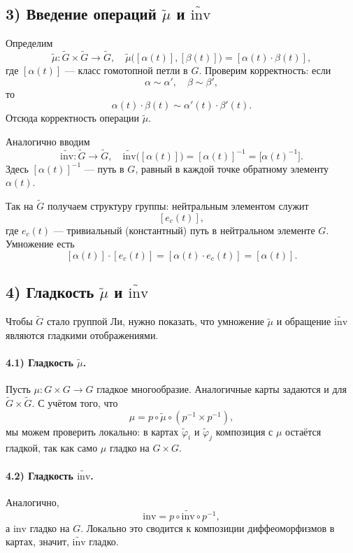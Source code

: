 \documentclass{article}
\begin{document}
\subsection*{3) Введение операций $\widetilde{\mu}$ и $\widetilde{\mathrm{inv}}$}
Определим
\[
\widetilde{\mu} \colon \widetilde{G} \times \widetilde{G} \to \widetilde{G},
\quad
\widetilde{\mu}\bigl([\alpha(t)], [\beta(t)]\bigr) = [\alpha(t) \cdot \beta(t)],
\]
где $[\alpha(t)]$ --- класс гомотопной петли в $G$. Проверим корректность: если
\[
\alpha \sim \alpha', \quad \beta \sim \beta',
\]
то
\[
\alpha(t)\cdot \beta(t) \sim \alpha'(t)\cdot \beta'(t).
\]
Отсюда корректность операции $\widetilde{\mu}$.

Аналогично вводим
\[
\widetilde{\mathrm{inv}} \colon \widetilde{G} \to \widetilde{G}, \quad
\widetilde{\mathrm{inv}}\bigl([\alpha(t)]\bigr) = [\alpha(t)]^{-1} = \bigl[\alpha(t)^{-1}\bigr].
\]
Здесь $[\alpha(t)]^{-1}$ --- путь в $G$, равный в каждой точке обратному элементу $\alpha(t)$.

Так на $\widetilde{G}$ получаем структуру группы: нейтральным элементом служит
\[
[e_c(t)],
\]
где $e_c(t)$ --- тривиальный (константный) путь в нейтральном элементе $G$. Умножение есть
\[
[\alpha(t)] \cdot [e_c(t)] = [\alpha(t)\cdot e_c(t)] = [\alpha(t)].
\]

\subsection*{4) Гладкость $\widetilde{\mu}$ и $\widetilde{\mathrm{inv}}$}
Чтобы $\widetilde{G}$ стало группой Ли, нужно показать, что умножение $\widetilde{\mu}$ и обращение $\widetilde{\mathrm{inv}}$ являются гладкими отображениями.

\paragraph{4.1) Гладкость $\widetilde{\mu}$.}
Пусть $\mu \colon G \times G \to G$ гладкое многообразие. Аналогичные карты задаются и для $\widetilde{G} \times \widetilde{G}$. С учётом того, что
\[
\mu = p \circ \widetilde{\mu} \circ (p^{-1}\times p^{-1}),
\]
мы можем проверить локально: в картах $\widetilde{\varphi}_i$ и $\widetilde{\varphi}_j$ композиция с $\mu$ остаётся гладкой, так как само $\mu$ гладко на $G \times G$.

\paragraph{4.2) Гладкость $\widetilde{\mathrm{inv}}$.}
Аналогично,
\[
\mathrm{inv} = p \circ \widetilde{\mathrm{inv}} \circ p^{-1},
\]
а $\mathrm{inv}$ гладко на $G$. Локально это сводится к композиции диффеоморфизмов в картах, значит, $\widetilde{\mathrm{inv}}$ гладко.
\end{document}

